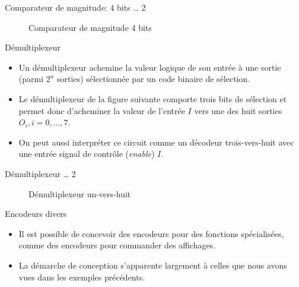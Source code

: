 \documentclass[presentation]{beamer}
\begin{document}
\begin{frame}[label={sec:org0fcb979}]{Comparateur de magnitude: 4 bits \ldots{} 2}
\begin{figure}[htbp]
\centering

\caption{\label{fig:orgf25414b}Comparateur de magnitude 4 bits}
\end{figure}
\end{frame}

\begin{frame}[label={sec:orgb3d8351}]{Démultiplexeur}
\begin{itemize}
\item Un démultiplexeur achemine la valeur logique de son entrée à une sortie (parmi \(2^n\) sorties) sélectionnée par un code binaire de sélection.

\item Le démultiplexeur de la figure suivante comporte trois bits de sélection et permet donc d'acheminer la valeur de l'entrée \(I\) vers une des huit sorties \(O_i, i = 0, \ldots, 7\).

\item On peut aussi interpréter ce circuit comme un décodeur trois-vers-huit avec une entrée signal de contrôle (\emph{enable}) \(I\).
\end{itemize}
\end{frame}

\begin{frame}[label={sec:org3b3d50d}]{Démultiplexeur \ldots{} 2}
\begin{figure}[htbp]
\centering

\caption{\label{fig:org97f0031}Démultiplexeur un-vers-huit}
\end{figure}
\end{frame}

\begin{frame}[label={sec:orge895e11}]{Encodeurs divers}
\begin{itemize}
\item Il est possible de concevoir des encodeurs pour des fonctions spécialisées, comme des encodeurs pour commander des affichages.

\item La démarche de conception s'apparente largement à celles que nous avons vues dans les exemples précédents.
\end{itemize}
\end{frame}
\end{document}
